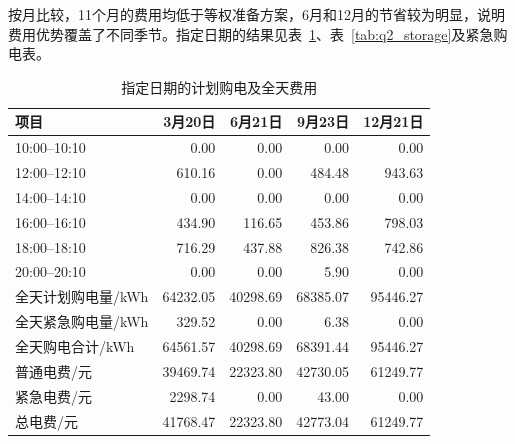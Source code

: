 按月比较，11个月的费用均低于等权准备方案，6月和12月的节省较为明显，说明费用优势覆盖了不同季节。指定日期的结果见表~\ref{tab:q2_specified_purchase}、表~\ref{tab:q2_storage}及紧急购电表。

\begin{table}[!htbp]
\centering
\caption{指定日期的计划购电及全天费用}
\label{tab:q2_specified_purchase}
\begin{tabular}{lrrrr}
\hline
项目 & 3月20日 & 6月21日 & 9月23日 & 12月21日 \\
\hline
10:00--10:10
& 0.00 & 0.00 & 0.00 & 0.00 \\
12:00--12:10
& 610.16 & 0.00 & 484.48 & 943.63 \\
14:00--14:10
& 0.00 & 0.00 & 0.00 & 0.00 \\
16:00--16:10
& 434.90 & 116.65 & 453.86 & 798.03 \\
18:00--18:10
& 716.29 & 437.88 & 826.38 & 742.86 \\
20:00--20:10
& 0.00 & 0.00 & 5.90 & 0.00 \\
全天计划购电量/kWh
& 64232.05 & 40298.69 & 68385.07 & 95446.27 \\
全天紧急购电量/kWh
& 329.52 & 0.00 & 6.38 & 0.00 \\
全天购电合计/kWh
& 64561.57 & 40298.69 & 68391.44 & 95446.27 \\
普通电费/元
& 39469.74 & 22323.80 & 42730.05 & 61249.77 \\
紧急电费/元
& 2298.74 & 0.00 & 43.00 & 0.00 \\
总电费/元
& 41768.47 & 22323.80 & 42773.04 & 61249.77 \\
\hline
\end{tabular}
\end{table}

